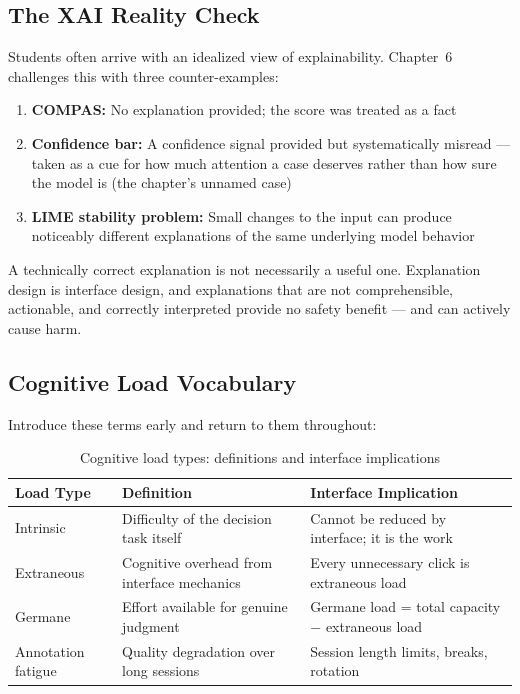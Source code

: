\subsection{The XAI Reality Check}

Students often arrive with an idealized view of explainability. Chapter~6 challenges this with three counter-examples:

\begin{enumerate}
    \item \textbf{COMPAS:} No explanation provided; the score was treated as a fact
    \item \textbf{Confidence bar:} A confidence signal provided but systematically misread --- taken as a cue for how much attention a case deserves rather than how sure the model is (the chapter's unnamed case)
    \item \textbf{LIME stability problem:} Small changes to the input can produce noticeably different explanations of the same underlying model behavior
\end{enumerate}

\begin{cautionbox}
A technically correct explanation is not necessarily a useful one. Explanation design is interface design, and explanations that are not comprehensible, actionable, and correctly interpreted provide no safety benefit --- and can actively cause harm.
\end{cautionbox}

\subsection{Cognitive Load Vocabulary}

Introduce these terms early and return to them throughout:

\begin{table}[htbp]
\caption{Cognitive load types: definitions and interface implications}
\label{tab:cognitive-load-ch06}
\centering
\begin{tabular}{@{}p{2.5cm}p{4.5cm}p{4cm}@{}}
\toprule
\textbf{Load Type} & \textbf{Definition} & \textbf{Interface Implication} \\
\midrule
Intrinsic & Difficulty of the decision task itself & Cannot be reduced by interface; it is the work \\
Extraneous & Cognitive overhead from interface mechanics & Every unnecessary click is extraneous load \\
Germane & Effort available for genuine judgment & Germane load = total capacity $-$ extraneous load \\
Annotation fatigue & Quality degradation over long sessions & Session length limits, breaks, rotation \\
\bottomrule
\end{tabular}
\end{table}

